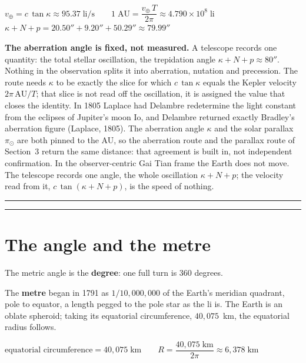 \documentclass[11pt]{article}
\newcommand{\partdiv}[1]{%
  \par\vspace{7pt}\noindent\rule{\linewidth}{0.9pt}\par\vspace{2pt}%
  \noindent{\large\bfseries #1}\par\vspace{1pt}%
  \noindent\rule{\linewidth}{0.4pt}\par\vspace{4pt}}
\begin{document}
\begin{tcolorbox}[mathbox]
$v_\oplus = c\,\tan\kappa \approx 95.37\;\text{li/s}
\qquad
1\;\text{AU} = \dfrac{v_\oplus\,T}{2\pi} \approx 4.790\times10^{8}\;\text{li}$
\\[8pt]
$\kappa + N + p = 20.50'' + 9.20'' + 50.29'' \approx 79.99''$
\end{tcolorbox}

\begin{tcolorbox}[quotebox]
\textbf{The aberration angle is fixed, not measured.} A telescope records one
quantity: the total stellar oscillation, the trepidation angle
$\kappa+N+p \approx 80''$. Nothing in the observation splits it into
aberration, nutation and precession. The route needs $\kappa$ to be exactly
the slice for which $c\,\tan\kappa$ equals the Kepler velocity
$2\pi\,\text{AU}/T$; that slice is not read off the oscillation, it is
assigned the value that closes the identity. In 1805 Laplace had Delambre
redetermine the light constant from the eclipses of Jupiter's moon Io, and
Delambre returned exactly Bradley's aberration figure (Laplace, 1805). The
aberration angle $\kappa$ and the solar parallax $\pi_\odot$ are both pinned
to the AU, so the aberration route and the parallax route of Section~3
return the same distance: that agreement is built in, not independent
confirmation. In the observer-centric Gai Tian frame the Earth does not move.
The telescope records one angle, the whole oscillation $\kappa+N+p$; the
velocity read from it, $c\,\tan(\kappa+N+p)$, is the speed of nothing.
\end{tcolorbox}

\partdiv{Part II: The Metric System}

\section{The angle and the metre}

The metric angle is the \textbf{degree}: one full turn is 360 degrees.

The \textbf{metre} began in 1791 as $1/10{,}000{,}000$ of the Earth's
meridian quadrant, pole to equator, a length pegged to the pole star as the
li is. The Earth is an oblate spheroid; taking its equatorial circumference,
$40{,}075$~km, the equatorial radius follows.

\begin{tcolorbox}[mathbox]
$\text{equatorial circumference} = 40{,}075\;\text{km}
\qquad
R = \dfrac{40{,}075\;\text{km}}{2\pi} \approx 6{,}378\;\text{km}$
\end{tcolorbox}
\end{document}
